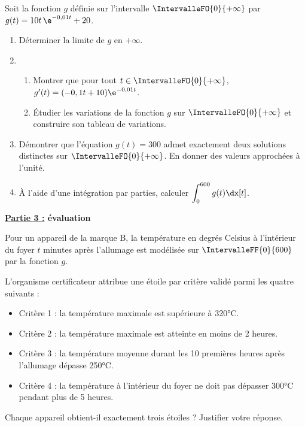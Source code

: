 \medskip

Soit la fonction $g$ définie sur l’intervalle $\IntervalleFO{0}{+\infty}$ par $g(t)=10t\,\e^{-0,01t}+20$.

\begin{enumerate}
	\item Déterminer la limite de $g$ en $+\infty$.
	\item 
	\begin{enumerate}
		\item Montrer que pour tout $t \in \IntervalleFO{0}{+\infty}$, $g'(t)=(-0,1t+10)\e^{-0,01t}$.
		\item Étudier les variations de la fonction $g$ sur $\IntervalleFO{0}{+\infty}$ et construire son tableau de variations.
	\end{enumerate}
	\item Démontrer que l’équation $g(t)=300$ admet exactement deux solutions distinctes sur $\IntervalleFO{0}{+\infty}$. En donner des valeurs approchées à l’unité.
	\item À l’aide d’une intégration par parties, calculer $\displaystyle\int_0^{600} g(t) \dx[t]$.
\end{enumerate}

\smallskip

\textbf{\underline{Partie 3 :}  évaluation}

\medskip

Pour un appareil de la marque B, la température en degrés Celsius à l’intérieur du foyer $t$ minutes après l’allumage est modélisée sur $\IntervalleFF{0}{600}$ par la fonction $g$.

\smallskip

L’organisme certificateur attribue une étoile par critère validé parmi les quatre suivants :

\begin{itemize}
	\item Critère 1 : la température maximale est supérieure à 320°C.
	\item Critère 2 : la température maximale est atteinte en moins de 2 heures.
	\item Critère 3 : la température moyenne durant les 10 premières heures après l’allumage dépasse 250°C.
	\item Critère 4 : la température à l’intérieur du foyer ne doit pas dépasser 300°C pendant plus de 5 heures.
\end{itemize}

Chaque appareil obtient-il exactement trois étoiles ? Justifier votre réponse.